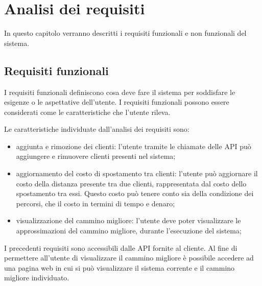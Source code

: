 \chapter{Analisi dei requisiti}\label{ch:analysis}

In questo capitolo verranno descritti i requisiti funzionali e non funzionali del sistema.
\section{Requisiti funzionali}\label{sec:functional}
I requisiti funzionali definiscono cosa deve fare il sistema per soddisfare le esigenze o le aspettative dell'utente. 
I requisiti funzionali possono essere considerati come le caratteristiche che l'utente rileva.

Le caratteristiche individuate dall'analisi dei requisiti sono:
\begin{itemize}
    \item aggiunta e rimozione dei clienti: l'utente tramite le chiamate delle API può aggiungere e rimuovere clienti presenti nel sistema;
    \item aggiornamento del costo di spostamento tra clienti: l'utente può aggiornare il costo della distanza presente tra due clienti, rappresentata dal costo dello spostamento tra essi.
            Questo costo può tenere conto sia della condizione dei percorsi, che il costo in termini di tempo e denaro;
    \item visualizzazione del cammino migliore: l'utente deve poter visualizzare le approssimazioni del cammino migliore, durante l'esecuzione del sistema;
\end{itemize}
I precedenti requisiti sono accessibili dalle API fornite al cliente. 
Al fine di permettere all'utente di visualizzare il cammino migliore è possibile accedere ad una pagina web in cui si può visualizzare il sistema corrente e il cammino migliore individuato.

